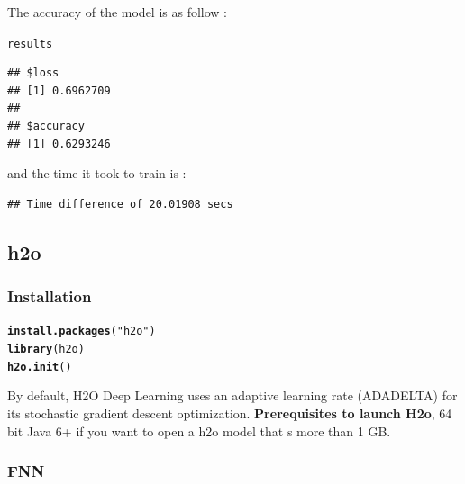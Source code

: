 \documentclass[letter,8pt]{article}\usepackage[]{graphicx}\usepackage[]{color}
\makeatletter
\newcommand{\hlstr}[1]{\textcolor[rgb]{0.192,0.494,0.8}{#1}}%
\newcommand{\hlstd}[1]{\textcolor[rgb]{0.345,0.345,0.345}{#1}}%
\newcommand{\hlkwd}[1]{\textcolor[rgb]{0.737,0.353,0.396}{\textbf{#1}}}%
\newenvironment{kframe}{%
 \def\at@end@of@kframe{}%
 \ifinner\ifhmode%
  \def\at@end@of@kframe{\end{minipage}}%
  \begin{minipage}{\columnwidth}%
 \fi\fi%
 \def\FrameCommand##1{\hskip\@totalleftmargin \hskip-\fboxsep
 \colorbox{shadecolor}{##1}\hskip-\fboxsep
     \hskip-\linewidth \hskip-\@totalleftmargin \hskip\columnwidth}%
 \MakeFramed {\advance\hsize-\width
   \@totalleftmargin\z@ \linewidth\hsize
   \@setminipage}}%
 {\par\unskip\endMakeFramed%
 \at@end@of@kframe}
\newenvironment{knitrout}{}{} %
\makeatother
\begin{document}
The accuracy of the model is as follow :
\begin{knitrout}
\color{fgcolor}\begin{kframe}
\begin{alltt}
\hlstd{results}
\end{alltt}
\begin{verbatim}
## $loss
## [1] 0.6962709
## 
## $accuracy
## [1] 0.6293246
\end{verbatim}
\end{kframe}
\end{knitrout}
and the time it took to train is :
\begin{knitrout}
\color{fgcolor}\begin{kframe}
\begin{verbatim}
## Time difference of 20.01908 secs
\end{verbatim}
\end{kframe}
\end{knitrout}
\subsection{h2o}
\subsubsection{Installation}
\begin{knitrout}
\color{fgcolor}\begin{kframe}
\begin{alltt}
\hlkwd{install.packages}\hlstd{(}\hlstr{"h2o"}\hlstd{)}
\hlkwd{library}\hlstd{(h2o)}
\hlkwd{h2o.init}\hlstd{()}
\end{alltt}
\end{kframe}
\end{knitrout}
By default, H2O Deep Learning uses an adaptive learning rate (ADADELTA) for its stochastic gradient descent optimization.
\textbf{Prerequisites to launch H2o}, 64 bit Java 6+ if you want to open a h2o model that s more than 1 GB. 
\subsubsection{FNN}
\end{document}
